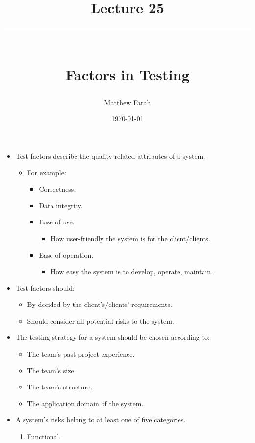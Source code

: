 \documentclass{article}
\date{
	\vspace{-.75em}
	{\large \today}
}
\title{
	\vspace*{-1.5em}
	{\Huge Lecture 25} \\
	\vspace{-1em}
	\rule{\textwidth/4}{.01em} \\
	\vspace{-.25em}
	{\Large Factors in Testing}
	\vspace{-.75em}
}
\author{
	{\large Matthew Farah}
}
\newcounter{example}
\begin{document}
\maketitle
\pagestyle{fancy}

\fi

\begin{itemize}
	\item Test factors describe the quality-related attributes of a system.
	\begin{itemize}
		\item For example:
		\begin{itemize}
			\item Correctness.
			\item Data integrity.
			\item Ease of use.
			\begin{itemize}
				\item How user-friendly the system is for the client/clients.
			\end{itemize}
			\item Ease of operation.
			\begin{itemize}
				\item How easy the system is to develop, operate, maintain.
			\end{itemize}
		\end{itemize}
	\end{itemize}
	\item Test factors should:
	\begin{itemize}
		\item By decided by the client's/clients' requirements.
		\item Should consider all potential risks to the system.
	\end{itemize}
	\item The testing strategy for a system should be chosen according to:
	\begin{itemize}
		\item The team's past project experience.
		\item The team's size.
		\item The team's structure.
		\item The application domain of the system.
	\end{itemize}
	\item A system's risks belong to at least one of five categories.
	\begin{enumerate}
		\item Functional.
		\begin{itemize}

\end{itemize}
\end{enumerate}
\end{itemize}
\end{document}
